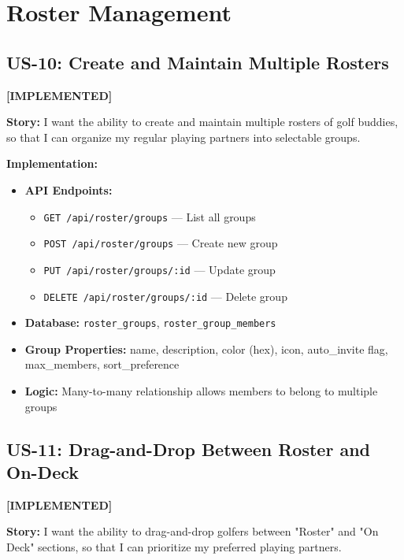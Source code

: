 \documentclass[11pt,a4paper]{article}
\newcommand{\implemented}{\textcolor{implemented}{\textbf{[IMPLEMENTED]}}}
\begin{document}
\section{Roster Management}

\subsection{US-10: Create and Maintain Multiple Rosters}
\implemented

\textbf{Story:} I want the ability to create and maintain multiple rosters of golf buddies, so that I can organize my regular playing partners into selectable groups.

\textbf{Implementation:}
\begin{itemize}[leftmargin=*]
  \item \textbf{API Endpoints:}
    \begin{itemize}
      \item \texttt{GET /api/roster/groups} --- List all groups
      \item \texttt{POST /api/roster/groups} --- Create new group
      \item \texttt{PUT /api/roster/groups/:id} --- Update group
      \item \texttt{DELETE /api/roster/groups/:id} --- Delete group
    \end{itemize}
  \item \textbf{Database:} \texttt{roster\_groups}, \texttt{roster\_group\_members}
  \item \textbf{Group Properties:} name, description, color (hex), icon, auto\_invite flag, max\_members, sort\_preference
  \item \textbf{Logic:} Many-to-many relationship allows members to belong to multiple groups
\end{itemize}

\subsection{US-11: Drag-and-Drop Between Roster and On-Deck}
\implemented

\textbf{Story:} I want the ability to drag-and-drop golfers between "Roster" and "On Deck" sections, so that I can prioritize my preferred playing partners.
\end{document}
